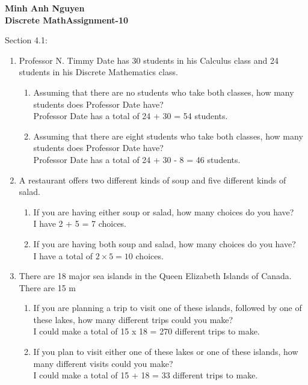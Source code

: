 \documentclass[10pt]{article}
\begin{document}
\textbf{Minh Anh Nguyen }\\
\textbf{Discrete Math\hfill Assignment-10}

\hrulefill

Section 4.1:

\begin{enumerate}
  \item Professor N. Timmy Date has 30 students in his Calculus class and 24 students in his Discrete Mathematics class.
        \begin{enumerate}
          \item Assuming that there are no students who take both classes, how many students does Professor Date have?\\
          Professor Date has a total of 24 + 30 = 54 students.

          \item Assuming that there are eight students who take both classes, how many students does Professor Date have?\\
          Professor Date has a total of 24 + 30 - 8 = 46 students.

        \end{enumerate}

  \item A restaurant offers two different kinds of soup and five different kinds of salad.
        \begin{enumerate}
          \item If you are having either soup or salad, how many choices do you have?\\
          I have 2 + 5 = 7 choices.
          \item If you are having both soup and salad, how many choices do you have?\\
          I have a total of $2 \times 5 = 10$ choices.
        \end{enumerate}

  \item There are 18 major sea islands in the Queen Elizabeth Islands of Canada. There are 15 m\\
        \begin{enumerate}
        \item If you are planning a trip to visit one of these islands, followed by one of these lakes, how many different trips could you make?\\
        I could make a total of 15 x 18 = 270 different trips to make.
        \item If you plan to visit either one of these lakes or one of these islands, how many different visits could you make?\\
        I could make a total of 15 + 18 = 33 different trips to make.
        \end{enumerate}


\end{enumerate}
\end{document}
